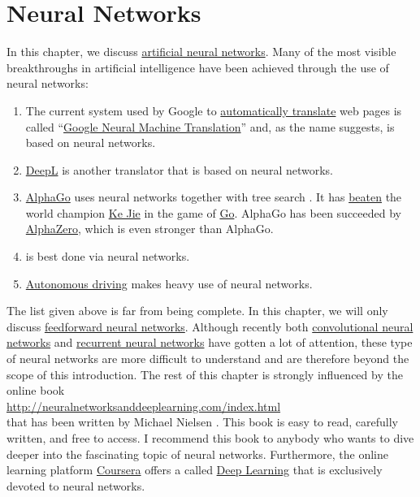 \chapter{Neural Networks}
In this chapter, we discuss \href{https://en.wikipedia.org/wiki/Artificial_neural_network}{artificial neural networks}.
Many of the most visible breakthroughs in artificial intelligence have been achieved through the use of neural
networks: 
\begin{enumerate}
\item The current system used by Google to \href{https://translate.google.com}{automatically translate} web
      pages is called 
      ``\href{https://en.wikipedia.org/wiki/Google_Neural_Machine_Translation}{Google Neural Machine Translation}''
      and, as the name suggests, is based on neural networks. 
\item \href{https://www.deepl.com/translator}{DeepL} is another translator that is based on neural networks.      
\item \href{https://en.wikipedia.org/wiki/AlphaGo}{AlphaGo} uses neural networks together with tree search
      \cite{silver:2016}.  It has \href{https://en.wikipedia.org/wiki/AlphaGo_versus_Ke_Jie}{beaten} 
      the world champion \href{https://en.wikipedia.org/wiki/Ke_Jie}{Ke Jie} in the game of
      \href{https://en.wikipedia.org/wiki/Go_(game)}{Go}. AlphaGo has been succeeded by
      \href{https://en.wikipedia.org/wiki/AlphaZero}{AlphaZero}, which is even stronger than AlphaGo.
\item {} is best done via neural networks.
\item \href{https://en.wikipedia.org/wiki/Autonomous_car}{Autonomous driving} makes heavy use of neural networks.
\end{enumerate}
The list given above is far from being complete.  In this chapter, we will only discuss 
\href{https://en.wikipedia.org/wiki/Feedforward_neural_network}{feedforward neural networks}.  Although recently both 
\href{https://en.wikipedia.org/wiki/Convolutional_neural_network}{convolutional neural networks} and
\href{https://en.wikipedia.org/wiki/Recurrent_neural_network}{recurrent neural networks} have gotten a lot of
attention, these type of neural networks are more difficult to understand and are therefore beyond the scope of this
introduction.  The rest of this chapter is strongly influenced by the online book 
\\[0.2cm]
\hspace*{1.3cm}
\href{http://neuralnetworksanddeeplearning.com/index.html}{http://neuralnetworksanddeeplearning.com/index.html}
\\[0.2cm]
that has been written by Michael Nielsen \cite{nielsen:2015}.  This book is easy to read, carefully written, and
free to access.  I recommend this book to anybody who wants to dive deeper into the fascinating topic of neural
networks.  Furthermore, the online learning platform \href{https://www.coursera.org/}{Coursera} offers a
 called \href{https://www.coursera.org/specializations/deep-learning}{Deep Learning} that
is exclusively devoted to neural networks.

